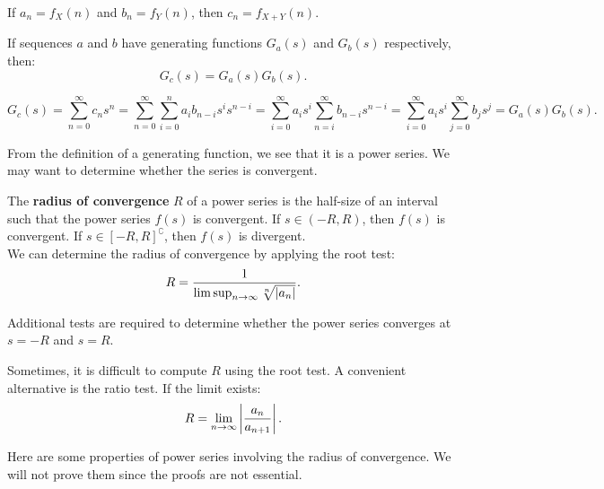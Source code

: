 \documentclass{huhtakm-template-book-v2}
\begin{document}
    \begin{eg}
        If $a_{n} = f_{X}(n)$ and $b_{n} = f_{Y}(n)$, then $c_{n} = f_{X+Y}(n)$.
    \end{eg}
    \begin{lem}
        If sequences $a$ and $b$ have generating functions $G_{a}(s)$ and $G_{b}(s)$ respectively, then:
        \begin{equation*}
            G_{c}(s) = G_{a}(s)G_{b}(s).
        \end{equation*}
    \end{lem}
    \begin{proofing}
        \begin{equation*}
            G_{c}(s) = \sum_{n = 0}^{\infty}c_{n}s^{n} = \sum_{n = 0}^{\infty}\sum_{i = 0}^{n}a_{i}b_{n-i}s^{i}s^{n-i} = \sum_{i = 0}^{\infty}a_{i}s^{i}\sum_{n = i}^{\infty}b_{n-i}s^{n-i} = \sum_{i = 0}^{\infty}a_{i}s^{i}\sum_{j = 0}^{\infty}b_{j}s^{j} = G_{a}(s)G_{b}(s).
        \end{equation*}
    \end{proofing}
    From the definition of a generating function, we see that it is a power series. We may want to determine whether the series is convergent.
    \begin{defn}
        The \textbf{radius of convergence} $R$ of a power series is the half-size of an interval such that the power series $f(s)$ is convergent. If $s \in (-R,R)$, then $f(s)$ is convergent. If $s \in [-R,R]^{\complement}$, then $f(s)$ is divergent.\\
        We can determine the radius of convergence by applying the root test:
        \begin{equation*}
            R = \frac{1}{\limsup_{n \to \infty}\sqrt[n]{\left|{a_{n}}\right|}}.
        \end{equation*}
    \end{defn}
    \begin{rem}
        Additional tests are required to determine whether the power series converges at $s = -R$ and $s = R$.
    \end{rem}
    \begin{rem}
        Sometimes, it is difficult to compute $R$ using the root test. A convenient alternative is the ratio test. If the limit exists:
        \begin{equation*}
            R = \lim_{n \to \infty}\left|{\frac{a_{n}}{a_{n+1}}}\right|.
        \end{equation*}
    \end{rem}
    Here are some properties of power series involving the radius of convergence. We will not prove them since the proofs are not essential.
\end{document}
